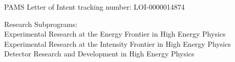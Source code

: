 \begin{center}
PAMS Letter of Intent tracking number:  LOI-0000014874
\vspace*{0.15in}

Research Subprograms:  \\
Experimental Research at the Energy Frontier in High Energy Physics  \\
Experimental Research at the Intensity Frontier in High Energy Physics  \\
Detector Research and Development in High Energy Physics  \\

\vspace{.3in}
\end{center}
